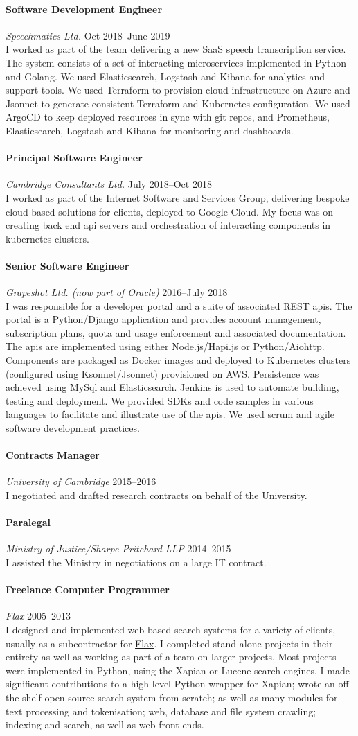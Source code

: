 \documentclass[11pt,a4paper]{article}
\newcommand{\centry}[3]{\paragraph{#1} \textit{#2}%
\hfill#3\\[2pt]}
\begin{document}
\centry{Software Development Engineer}{Speechmatics Ltd.}{Oct 2018--June 2019}

I worked as part of the team delivering a new SaaS speech transcription
service. The system consists of a set of interacting microservices implemented
in Python and Golang. We used Elasticsearch, Logstash and Kibana for analytics
and support tools. We used Terraform to provision cloud infrastructure on Azure
and Jsonnet to generate consistent Terraform and Kubernetes
configuration. We used ArgoCD to keep deployed resources in sync with
git repos, and Prometheus, Elasticsearch, Logstash and Kibana for
monitoring and dashboards.

\centry{Principal Software Engineer}{Cambridge Consultants Ltd.}{July 2018--Oct
2018}

I worked as part of the Internet Software and Services Group, delivering
bespoke cloud-based solutions for clients, deployed to Google Cloud. My focus
was on creating back end api servers and orchestration of interacting
components in kubernetes clusters.

\centry{Senior Software Engineer}{Grapeshot Ltd. (now part of
  Oracle)}{2016--July 2018}

I was responsible for a developer portal and a suite of associated REST
apis. The portal is a Python/Django application and provides account
management, subscription plans, quota and usage enforcement and associated
documentation. The apis are implemented using either Node.js/Hapi.js or
Python/Aiohttp. Components are packaged as Docker images and deployed to
Kubernetes clusters (configured using Ksonnet/Jsonnet) provisioned on
AWS. Persistence was achieved using MySql and Elasticsearch. Jenkins is used to
automate building, testing and deployment. We provided SDKs and code samples in
various languages to facilitate and illustrate use of the apis. We used scrum
and agile software development practices.

\centry{Contracts Manager}{University of Cambridge}{2015--2016}
I negotiated and drafted research contracts on behalf of the University.

\centry{Paralegal}{Ministry of Justice/Sharpe Pritchard LLP}{2014--2015} I
assisted the Ministry in negotiations on a large IT contract.

\centry{Freelance Computer Programmer}{Flax}{2005--2013} I designed and
implemented web-based search systems for a variety of clients, usually as a
subcontractor for \href{http://www.flax.co.uk}{Flax}. I completed stand-alone
projects in their entirety as well as working as part of a team on larger
projects.  Most projects were implemented in Python, using the Xapian or Lucene
search engines. I made significant contributions to a high level Python wrapper
for Xapian; wrote an off-the-shelf open source search system from scratch; as
well as many modules for text processing and tokenisation; web, database and
file system crawling; indexing and search, as well as web front ends.
\end{document}
